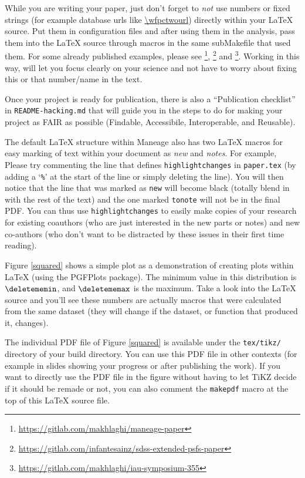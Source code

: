 \documentclass[10pt, twocolumn]{article}
\begin{document}
While you are writing your paper, just don't forget to \emph{not} use
numbers or fixed strings (for example database urls like \url{\wfpctwourl})
directly within your \LaTeX{} source. Put them in configuration files and
after using them in the analysis, pass them into the \LaTeX{} source
through macros in the same subMakefile that used them. For some already
published examples, please see
\citet{akhlaghi20}\footnote{\url{https://gitlab.com/makhlaghi/maneage-paper}},
\citet{infantesainz20}\footnote{\url{https://gitlab.com/infantesainz/sdss-extended-psfs-paper}}
and
\citet{akhlaghi19}\footnote{\url{https://gitlab.com/makhlaghi/iau-symposium-355}}. Working
in this way, will let you focus clearly on your science and not have to
worry about fixing this or that number/name in the text.

Once your project is ready for publication, there is also a ``Publication
checklist'' in \texttt{README-hacking.md} that will guide you in the steps
to do for making your project as FAIR as possible (Findable, Accessibile,
Interoperable, and Reusable).

The default \LaTeX{} structure within Maneage also has two \LaTeX{} macros
for easy marking of text within your document as \emph{new} and
\emph{notes}. For example, 
 Please try commenting
the line that defines \texttt{highlightchanges} in \texttt{paper.tex} (by
adding a `\texttt{\%}' at the start of the line or simply deleting the
line). You will then notice that the line that was marked as \texttt{new}
will become black (totally blend in with the rest of the text) and the one
marked \texttt{tonote} will not be in the final PDF. You can thus use
\texttt{highlightchanges} to easily make copies of your research for
existing coauthors (who are just interested in the new parts or notes) and
new co-authors (who don't want to be distracted by these issues in their
first time reading).

Figure \ref{squared} shows a simple plot as a demonstration of creating
plots within \LaTeX{} (using the {\small PGFP}lots package). The minimum
value in this distribution is $\deletememin$, and $\deletememax$ is the
maximum. Take a look into the \LaTeX{} source and you'll see these numbers
are actually macros that were calculated from the same dataset (they will
change if the dataset, or function that produced it, changes).

The individual {\small PDF} file of Figure \ref{squared} is available under
the \texttt{tex/tikz/} directory of your build directory. You can use this
PDF file in other contexts (for example in slides showing your progress or
after publishing the work). If you want to directly use the {\small PDF}
file in the figure without having to let {\small T}i{\small KZ} decide if
it should be remade or not, you can also comment the \texttt{makepdf} macro
at the top of this \LaTeX{} source file.
\end{document}
